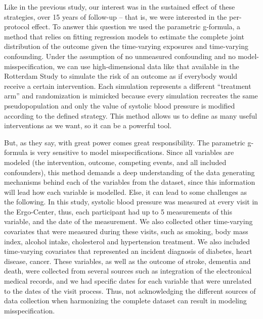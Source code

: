 \documentclass[
]{book}
\begin{document}
Like in the previous study, our interest was in the sustained effect of these strategies, over 15 years of follow-up -- that is, we were interested in the per-protocol effect. To answer this question we used the parametric g-formula, a method that relies on fitting regression models to estimate the complete joint distribution of the outcome given the time-varying exposures and time-varying confounding\autocite{robins1986,whatif2020}. Under the assumption of no unmeasured confounding and no model-misspecification, we can use high-dimensional data like that available in the Rotterdam Study to simulate the risk of an outcome as if everybody would receive a certain intervention. Each simulation represents a different ``treatment arm'' and randomization is mimicked because every simulation recreates the same pseudopopulation and only the value of systolic blood pressure is modified according to the defined strategy\autocite{taubman2009,young2011}. This method allows us to define as many useful interventions as we want, so it can be a powerful tool.

But, as they say, with great power comes great responsibility. The parametric g-formula is very sensitive to model misspecifications. Since all variables are modeled (the intervention, outcome, competing events, and all included confounders), this method demands a deep understanding of the data generating mechanisms behind each of the variables from the dataset, since this information will lead how each variable is modelled. Else, it can lead to some challenges as the following. In this study, systolic blood pressure was measured at every visit in the Ergo-Center, thus, each participant had up to 5 measurements of this variable, and the date of the measurement. We also collected other time-varying covariates that were measured during these visits, such as smoking, body mass index, alcohol intake, cholesterol and hypertension treatment. We also included time-varying covariates that represented an incident diagnosis of diabetes, heart disease, cancer. These variables, as well as the outcome of stroke, dementia and death, were collected from several sources such as integration of the electronical medical records, and we had specific dates for each variable that were unrelated to the dates of the visit process. Thus, not acknowledging the different sources of data collection when harmonizing the complete dataset can result in modeling misspecification.
\end{document}
